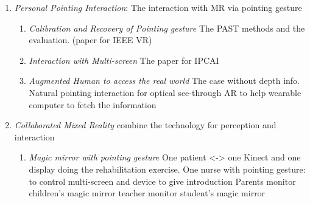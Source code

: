 \begin{enumerate}
	\item
		\emph{Personal Pointing Interaction}: The interaction with MR via pointing gesture
		\begin{enumerate}
			\item \emph{Calibration and Recovery of Pointing gesture} The PAST methods and the evaluation. (paper for IEEE VR)
			\item \emph{Interaction with Multi-screen} The paper for IPCAI
			\item \emph{Augmented Human to access the real world} The case without depth info. Natural pointing interaction for optical see-through AR to help wearable computer to fetch the information%
		\end{enumerate}
	\item \emph{Collaborated Mixed Reality} combine the technology for perception and interaction
		\begin{enumerate}
			\item \emph{Magic mirror with pointing gesture} One patient <-> one Kinect and one display  doing the rehabilitation exercise.
			One nurse with pointing gesture: to control multi-screen and device to give introduction 
			Parents monitor children’s magic mirror  teacher monitor student’s magic mirror 
			
		\end{enumerate}
\end{enumerate}




